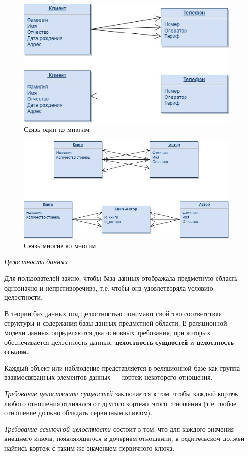 \begin{figure}[!h]
    \centering
    \includegraphics[scale = 0.5]{1/1kn.jpg}
    \caption{Связь один ко многим}
    \label{fig:onekn}
\end{figure}

\begin{figure}[!h]
    \centering
    \includegraphics[scale = 0.5]{1/nkn.jpg}
    \caption{Связь многие ко многим}
    \label{fig:nkn}
\end{figure}


\begin{center}
\textit{\underline{Целостность данных.}}
\end{center}

Для пользователей важно, чтобы база данных отображала предметную область однозначно и непротиворечиво, т.е. чтобы она удовлетворяла условию целостности.

В теории баз данных под целостностью понимают свойство соответствия структуры и содержания базы данных предметной области. В реляционной модели данных определяются два основных требования, при которых обеспечивается целостность данных: \textbf{целостность сущностей} и \textbf{целостность ссылок.}

Каждый объект или наблюдение представляется в реляционной базе как группа взаимосвязанных элементов данных — кортеж некоторого отношения.

\textit{Требование целостности сущностей} заключается в том, чтобы каждый кортеж любого отношения отличался от другого кортежа этого отношения (т.е. любое отношение должно обладать первичным ключом).

\textit{Требование ссылочной целостности} состоит в том, что для каждого значения внешнего ключа, появляющегося в дочернем отношении, в родительском должен найтись кортеж с таким же значением первичного ключа.

